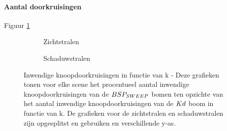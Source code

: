\begin{figure}
  \centering
  
\end{figure}

\paragraph{Aantal doorkruisingen}
Figuur \ref{fig:k-doorkruisingen}
\begin{figure}
  \centering
  \begin{subfigure}{\linewidth}
  \centering
  \begin{subfigure}[t]{.32\linewidth}
    \centering
{}
  \end{subfigure}
  \begin{subfigure}[t]{.32\linewidth}
    \centering
{}
\end{subfigure}
\begin{subfigure}[t]{.32\linewidth}
  \centering
{}
\end{subfigure}
\caption{Zichtstralen}
\end{subfigure}
  \begin{subfigure}{\linewidth}
  \centering
  \begin{subfigure}[t]{.32\linewidth}
    \centering
{}
  \end{subfigure}
  \begin{subfigure}[t]{.32\linewidth}
    \centering
{}
\end{subfigure}
\begin{subfigure}[t]{.32\linewidth}
  \centering
{}
\end{subfigure}
\caption{Schaduwstralen}
\end{subfigure}
\caption[Inwendige knoopdoorkruisingen in functie van k]{Inwendige knoopdoorkruisingen in functie van k - \small Deze grafieken tonen voor elke scene het procentueel aantal inwendige knoopdoorkruisingen van de $BSP_{SWEEP}$ bomen ten opzichte van het aantal inwendige knoopdoorkruisingen van de $Kd$ boom in functie van k. De grafieken voor de zichtstralen en schaduwstralen zijn opgesplitst en gebruiken en verschillende y-as.}
\label{fig:k-doorkruisingen}
\end{figure}


